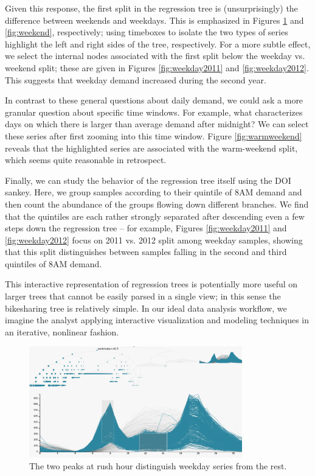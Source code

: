 \documentclass[12pt]{article}
\begin{document}
Given this response, the first split in the regression tree is
(unsurprisingly) the difference between weekends and weekdays. This is
emphasized in Figures \ref{fig:working} and \ref{fig:weekend}, respectively;
using timeboxes to isolate the two types of series highlight the left and right
sides of the tree, respectively. For a more subtle effect, we select the
internal nodes associated with the first split below the weekday vs. weekend
split; these are given in Figures \ref{fig:weekday2011} and
\ref{fig:weekday2012}. This suggests that weekday demand increased during the
second year.

In contrast to these general questions about daily demand, we could ask
a more granular question about specific time windows. For example, what
characterizes days on which there is larger than average demand after
midnight? We can select these series after first zooming into this time window.
Figure \ref{fig:warmweekend} reveals that the highlighted series are associated
with the warm-weekend split, which seems quite reasonable in retrospect.

Finally, we can study the behavior of the regression tree itself using
the DOI sankey. Here, we group samples according to their quintile of
8AM demand and then count the abundance of the groups flowing down
different branches. We find that the quintiles are each rather strongly
separated after descending even a few steps down the regression tree --
for example, Figures \ref{fig:weekday2011} and \ref{fig:weekday2012}
focus on 2011 vs. 2012 split among weekday samples, showing that this
split distinguishes between samples falling in the second and third
quintiles of 8AM demand.

This interactive representation of regression trees is potentially more
useful on larger trees that cannot be easily parsed in a single view; in
this sense the bikesharing tree is relatively simple. In our ideal data
analysis workflow, we imagine the analyst applying interactive
visualization and modeling techniques in an iterative, nonlinear
fashion.

\begin{figure}

{\centering \includegraphics[width=350px]{figure/working} 

}

\caption{The two peaks at rush hour distinguish weekday series from the rest.}\label{fig:working}
\end{figure}
\end{document}
